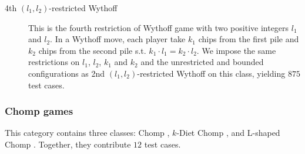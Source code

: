 \documentclass[review]{elsarticle}
\begin{document}
\begin{description}
	\item[4th $(l_1, l_2)$-restricted Wythoff]
	This is the fourth restriction of Wythoff game with two positive integers $l_1$ and $l_2$.
	In a Wythoff move, each player take $k_1$ chips from the first pile and $k_2$ chips from the second pile s.t. $ k_1 \cdot l_1 = k_2 \cdot l_2$.
	We impose the same restrictions on $l_1$, $l_2$, $k_1$ and $k_2$ and the unrestricted and bounded configurations as 2nd $(l_1, l_2)$-restricted Wythoff on this class, yielding $875$ test cases.
	
\end{description}

\subsubsection{Chomp games}
{\color{red}This category contains three classes: Chomp \cite{Sch1952}, $k$-Diet Chomp \cite{AhnCCEFGGKMPS2017}, and L-shaped Chomp \cite{Sch1952}.
Together, they contribute $12$ test cases.}

\end{document}
